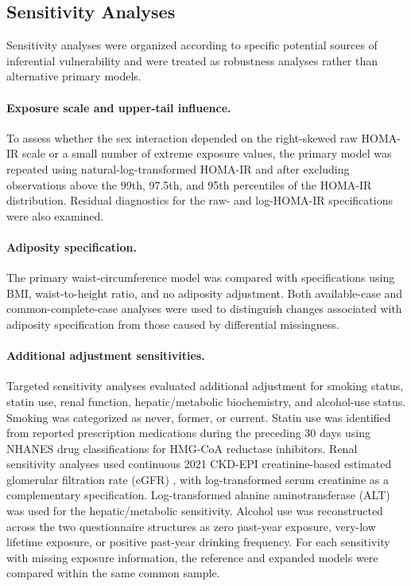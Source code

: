 \documentclass[11pt]{article}
\begin{document}
\subsection{Sensitivity Analyses}

Sensitivity analyses were organized according to specific potential sources of
inferential vulnerability and were treated as robustness analyses rather than
alternative primary models.

\paragraph{Exposure scale and upper-tail influence.}
To assess whether the sex interaction depended on the right-skewed raw
HOMA-IR scale or a small number of extreme exposure values, the primary model
was repeated using natural-log-transformed HOMA-IR and after excluding
observations above the 99th, 97.5th, and 95th percentiles of the HOMA-IR
distribution. Residual diagnostics for the raw- and log-HOMA-IR
specifications were also examined.

\paragraph{Adiposity specification.}
The primary waist-circumference model was compared with specifications using
BMI, waist-to-height ratio, and no adiposity adjustment. Both available-case
and common-complete-case analyses were used to distinguish changes associated
with adiposity specification from those caused by differential missingness.

\paragraph{Additional adjustment sensitivities.}
Targeted sensitivity analyses evaluated additional adjustment for smoking
status, statin use, renal function, hepatic/metabolic
biochemistry, and alcohol-use status. Smoking was categorized as never,
former, or current. Statin use was identified from reported prescription
medications during the preceding 30 days using NHANES drug classifications for
HMG-CoA reductase inhibitors. Renal sensitivity analyses used continuous
2021 CKD-EPI creatinine-based estimated glomerular filtration rate (eGFR)
\citep{Inker2021CKDEPI}, with log-transformed serum creatinine as a
complementary specification. Log-transformed alanine aminotransferase (ALT) was used for the
hepatic/metabolic sensitivity. Alcohol use was reconstructed across the two
questionnaire structures as zero past-year exposure, very-low lifetime
exposure, or positive past-year drinking frequency. For each sensitivity with
missing exposure information, the reference and expanded models were compared
within the same common sample.
\end{document}

